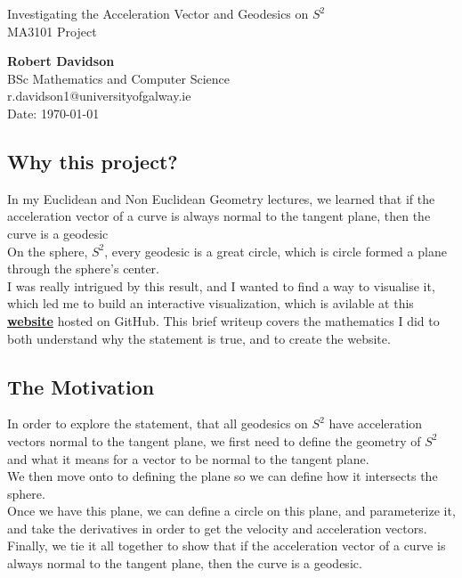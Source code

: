 \documentclass[11pt]{article}
\begin{document}
\begin{center}
    \vspace{0.5cm}
    Investigating the Acceleration Vector and Geodesics on $S^2$\\
    MA3101 Project\\[24pt]
    \LARGE

    \Large
    \textbf{Robert Davidson}\\[6pt]
    \small
    BSc Mathematics and Computer Science \\ r.davidson1@universityofgalway.ie\\[6pt]
    Date: \today\\[12pt]
\end{center}

\vspace{1.5cm}

\subsection*{Why this project?}
In my Euclidean and Non Euclidean Geometry lectures, we learned that if the acceleration vector of a curve is always normal to the tangent plane, then the curve is a geodesic\\[0.5ex]
On the sphere, $S^2$, every geodesic is a great circle, which is circle formed a plane through the sphere's center. \\[0.5ex]
I was really intrigued by this result, and I wanted to find a way to visualise it, which led me to build an interactive visualization, which is avilable at this \href{https://robertdavidson1.github.io/MA3101Project/}{\textbf{website}} hosted on GitHub.
This brief writeup covers the mathematics I did to both understand why the statement is true, and to create the website.

\subsection*{The Motivation}
In order to explore the statement, that all geodesics on $S^2$ have acceleration vectors normal to the tangent plane, we first need to define the geometry of $S^2$ and what it means for a vector to be normal to the tangent plane. \\[0.5ex] We then move onto to defining the plane so we can define how it intersects the sphere. \\[0.5ex]
Once we have this plane, we can define a circle on this plane, and parameterize it, and take the derivatives in order to get the velocity and acceleration vectors. \\[0.5ex]
Finally, we tie it all together to show that if the acceleration vector of a curve is always normal to the tangent plane, then the curve is a geodesic.
\end{document}
